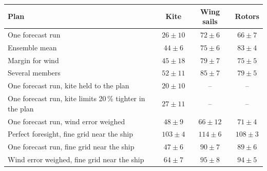 \begin{tabular}{@{}lccc@{}}
\toprule
Plan & Kite & Wing sails & Rotors \\
\midrule
One forecast run & \(26 \pm 10\) & \(72 \pm 6\) & \(66 \pm 7\) \\
Ensemble mean & \(44 \pm 6\) & \(75 \pm 6\) & \(83 \pm 4\) \\
Margin for wind & \(45 \pm 18\) & \(79 \pm 7\) & \(75 \pm 5\) \\
Several members & \(52 \pm 11\) & \(85 \pm 7\) & \(79 \pm 5\) \\
One forecast run, kite held to the plan & \(20 \pm 10\) & -- & -- \\
One forecast run, kite limits 20\,\% tighter in the plan & \(27 \pm 11\) & -- & -- \\
One forecast run, wind error weighed & \(48 \pm 9\) & \(66 \pm 12\) & \(71 \pm 4\) \\
Perfect foresight, fine grid near the ship & \(103 \pm 4\) & \(114 \pm 6\) & \(108 \pm 3\) \\
One forecast run, fine grid near the ship & \(47 \pm 6\) & \(90 \pm 7\) & \(89 \pm 6\) \\
Wind error weighed, fine grid near the ship & \(64 \pm 7\) & \(95 \pm 8\) & \(94 \pm 5\) \\
\bottomrule
\end{tabular}
